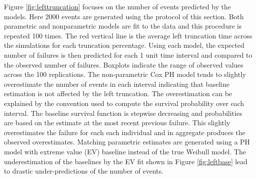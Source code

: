 \documentclass[12pt,letterpaper]{article}
\begin{document}
Figure \ref{fig:lefttruncation} focuses on the number of events predicted by the models. Here 2000 events are generated using the protocol of this section. Both parametric and nonparametric models are fit to the data and this procedure is repeated 100 times. The red vertical line is the average left truncation time across the simulations for each truncation percentage.  Using each model, the expected number of failures is then predicted for each 1 unit time interval and compared to the observed number of failures. Boxplots indicate the range of observed values across the 100 replications. The non-parametric Cox PH model tends to slightly overestimate the number of events in each interval indicating that baseline estimation is not affected by the left truncation.  The overestimation can be explained by the convention used to compute the survival probability over each interval.  The baseline survival function is stepwise decreasing and probabilities are based on the estimate at the most recent previous failure.  This slightly overestimates the failure for each each individual and in aggregate produces the observed overestimates.
Matching parametric estimates are generated using a PH model with extreme value (EV) baseline instead of the true Weibull model.  The underestimation of the baselines by the EV fit shown in Figure \ref{fig:leftbase} lead to drastic under-predictions of the number of events.





\end{document}
